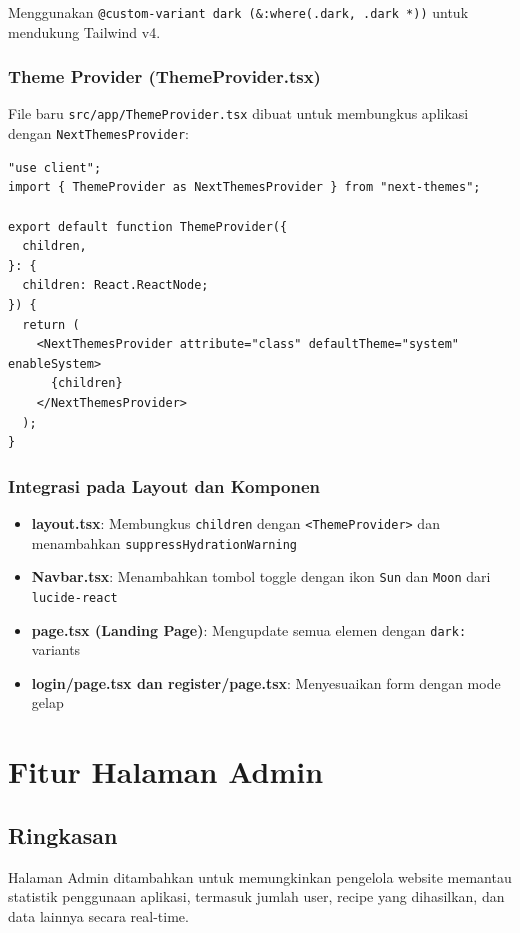 \documentclass[12pt, a4paper]{article}
\begin{document}
Menggunakan \texttt{@custom-variant dark (\&:where(.dark, .dark *))} untuk mendukung Tailwind v4.

\subsubsection{Theme Provider (ThemeProvider.tsx)}
File baru \texttt{src/app/ThemeProvider.tsx} dibuat untuk membungkus aplikasi dengan \texttt{NextThemesProvider}:
\begin{lstlisting}[language=tsx]
"use client";
import { ThemeProvider as NextThemesProvider } from "next-themes";

export default function ThemeProvider({
  children,
}: {
  children: React.ReactNode;
}) {
  return (
    <NextThemesProvider attribute="class" defaultTheme="system" enableSystem>
      {children}
    </NextThemesProvider>
  );
}
\end{lstlisting}

\subsubsection{Integrasi pada Layout dan Komponen}
\begin{itemize}
  \item \textbf{layout.tsx}: Membungkus \texttt{children} dengan \texttt{<ThemeProvider>} dan menambahkan \texttt{suppressHydrationWarning}
  \item \textbf{Navbar.tsx}: Menambahkan tombol toggle dengan ikon \texttt{Sun} dan \texttt{Moon} dari \texttt{lucide-react}
  \item \textbf{page.tsx (Landing Page)}: Mengupdate semua elemen dengan \texttt{dark:} variants
  \item \textbf{login/page.tsx dan register/page.tsx}: Menyesuaikan form dengan mode gelap
\end{itemize}

\section{Fitur Halaman Admin}

\subsection{Ringkasan}
Halaman Admin ditambahkan untuk memungkinkan pengelola website memantau statistik penggunaan aplikasi, termasuk jumlah user, recipe yang dihasilkan, dan data lainnya secara real-time.
\end{document}
